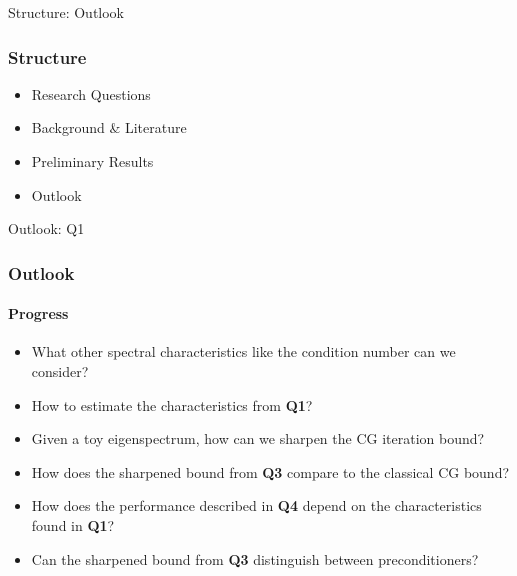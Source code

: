 \begin{frame}[label=outlook]{Structure: Outlook}
    \frametitle{Structure}
    \begin{itemize}
        \item Research Questions
        \item Background \& Literature
        \item Preliminary Results
        \item {\color{tud grapefruit}Outlook}
    \end{itemize}
\end{frame}

\begin{frame}[label=outlook]{Outlook: Q1}
    \frametitle{Outlook}
    \framesubtitle{Progress}
    \begin{itemize}
        \item<1->[\textbf{Q1}] \textcolor{tud green}{What other spectral characteristics like the condition number can we consider?}
        \item<3->[\textbf{Q2}] \textcolor{tud grapefruit}{How to estimate the characteristics from \textbf{Q1}?}
        \item<1->[\textbf{Q3}] \textcolor{tud green}{Given a toy eigenspectrum, how can we sharpen the CG iteration bound?}
        \item<2->[\textbf{Q4}] \textcolor{tud yellow}{How does the sharpened bound from \textbf{Q3} compare to the classical CG bound?}
        \item<2->[\textbf{Q5}] \textcolor{tud yellow}{How does the performance described in \textbf{Q4} depend on the characteristics found in \textbf{Q1}?}
        \item<2->[\textbf{Q6}] \textcolor{tud yellow}{Can the sharpened bound from \textbf{Q3} distinguish between preconditioners?} 
    \end{itemize}
\end{frame}